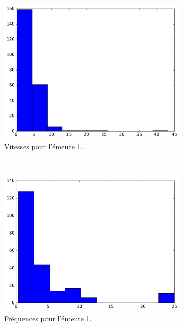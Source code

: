 \begin{appendices}
	\begin{figure}[htbp]
		\begin{subfigure}[t]{\subImgWclicks}
			\centering
			\includegraphics[width=\textwidth]{figures/ch3/riot_filteredSpeed}
			\caption{Vitesses pour l'émeute 1.}
			\label{fig:riot_filteredSpeed}
		\end{subfigure}
		~
		\begin{subfigure}[t]{\subImgWclicks}
			\centering
			\includegraphics[width=\textwidth]{figures/ch3/riot_frequency}
			\caption{Fréquences pour l'émeute 1.}
			\label{fig:riot_frequency}
		\end{subfigure}
		~
		\begin{subfigure}[t]{\subImgWclicks}

\end{subfigure}
\end{figure}
\end{appendices}
